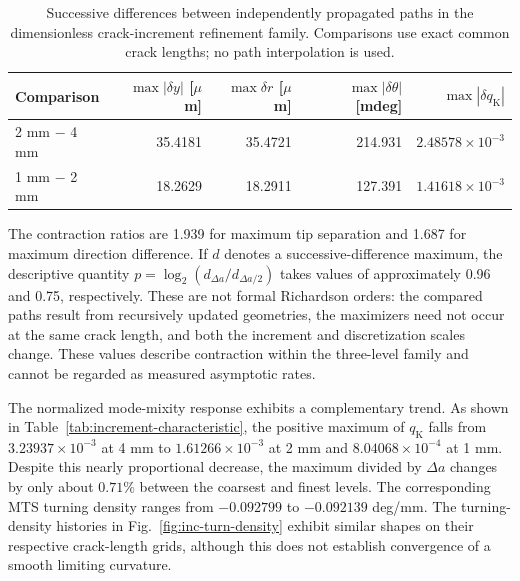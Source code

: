 \documentclass[11pt]{article}
\begin{document}
\begin{table}[H]
\centering
\small
\setlength{\tabcolsep}{4.0pt}
\caption{Successive differences between independently propagated paths in
the dimensionless crack-increment refinement family. Comparisons use exact
common crack lengths; no path interpolation is used.}
\label{tab:increment-pairwise}
\begin{tabular}{lrrrr}
\toprule
Comparison &
$\max|\delta y|$ [$\mu$m] &
$\max\delta r$ [$\mu$m] &
$\max|\delta\theta|$ [mdeg] &
$\max|\delta q_{\mathrm{K}}|$\\
\midrule
2 mm $-$ 4 mm & 35.4181 & 35.4721 & 214.931 & $2.48578\times10^{-3}$\\
1 mm $-$ 2 mm & 18.2629 & 18.2911 & 127.391 & $1.41618\times10^{-3}$\\
\bottomrule
\end{tabular}
\end{table}

The contraction ratios are 1.939 for maximum tip
separation and 1.687 for maximum direction difference.
If $d$ denotes a successive-difference maximum,
the descriptive quantity
$p=\log_2(d_{\Delta a}/d_{\Delta a/2})$
takes values of approximately 0.96 and 0.75,
respectively. These are not formal Richardson orders:
the compared paths result from recursively updated
geometries, the maximizers need not occur at the same
crack length, and both the increment and discretization
scales change. These values describe contraction within the three-level family
and cannot be regarded as measured asymptotic rates.

The normalized mode-mixity response exhibits a
complementary trend. As shown in
Table~\ref{tab:increment-characteristic}, the
positive maximum of $q_{\mathrm{K}}$ falls from
$3.23937\times10^{-3}$ at 4 mm to
$1.61266\times10^{-3}$ at 2 mm and
$8.04068\times10^{-4}$ at 1 mm.
Despite this nearly proportional decrease, the
maximum divided by $\Delta a$ changes by only
about $0.71\%$ between the coarsest and finest levels.
The corresponding MTS turning density ranges from
$-0.092799$ to $-0.092139$ deg/mm.
The turning-density histories in
Fig.~\ref{fig:inc-turn-density} exhibit similar shapes
on their respective crack-length grids, although this
does not establish convergence of a smooth limiting
curvature.
\end{document}
